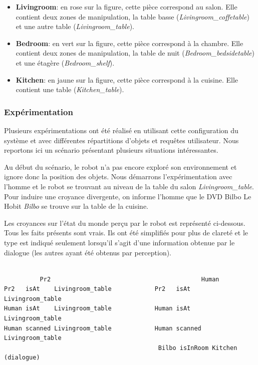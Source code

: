 \documentclass[a4paper,11pt,twoside]{StyleThese}
\begin{document}
\begin{itemize}
\item \textbf{Livingroom}: en rose sur la figure, cette pièce correspond au salon.
Elle contient deux zones de manipulation, la table basse (\textit{Livingroom\_coffetable}) et une autre table (\textit{Livingroom\_table}).

\item \textbf{Bedroom}: en vert sur la figure, cette pièce correspond à la chambre. Elle contient deux zones de manipulation, la table de nuit (\textit{Bedroom\_bedsidetable}) et une étagère (\textit{Bedroom\_shelf}).

\item \textbf{Kitchen}: en jaune sur la figure, cette pièce correspond à la cuisine. Elle contient une table (\textit{Kitchen\_table}).
\end{itemize}

\subsubsection{Expérimentation}


Plusieurs expérimentations ont été réalisé en utilisant cette configuration du système et avec différentes répartitions d'objets et requêtes utilisateur. Nous reportons ici un scénario présentant plusieurs situations intéressantes.

Au début du scénario, le robot n'a pas encore exploré son environnement et ignore donc la position des objets.
Nous démarrons l'expérimentation avec l'homme et le robot se trouvant au niveau de  la table du salon \textit{Livingroom\_table}. Pour induire une croyance divergente, on informe l'homme que le DVD Bilbo Le Hobit \textit{Bilbo} se trouve sur la table de la cuisine.

Les croyances sur l'état du monde perçu par le robot est représenté ci-dessous.
Tous les faits présents sont vrais. Ils ont été simplifiés pour plus de clareté et le type est indiqué seulement lorsqu'il s'agit d'une information obtenue par le dialogue (les autres ayant été obtenus par perception).


\begin{scriptsize}
\begin{verbatim}

          Pr2                                          Human
Pr2   isAt    Livingroom_table            Pr2   isAt     Livingroom_table
Human isAt    Livingroom_table            Human isAt     Livingroom_table
Human scanned Livingroom_table            Human scanned  Livingroom_table
                                           Bilbo isInRoom Kitchen  (dialogue)
\end{verbatim}
\end{scriptsize}
\end{document}
